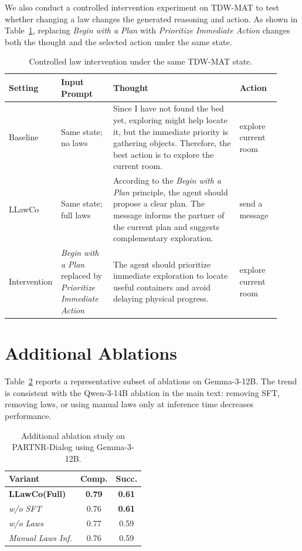\documentclass{article}
\theoremstyle{plain}
\theoremstyle{definition}
\theoremstyle{remark}
\newcommand{\name}{LLawCo\xspace}
\begin{document}
We also conduct a controlled intervention experiment on TDW-MAT to test whether changing a law changes the generated reasoning and action. As shown in Table~\ref{tab:law-intervention}, replacing \textit{Begin with a Plan} with \textit{Prioritize Immediate Action} changes both the thought and the selected action under the same state.

\begin{table}[htbp]
\centering
\small
\setlength{\tabcolsep}{4pt}
\caption{Controlled law intervention under the same TDW-MAT state.}
\label{tab:law-intervention}
\begin{tabular}{p{0.12\linewidth}|p{0.19\linewidth}|p{0.46\linewidth}|p{0.15\linewidth}}
\toprule
\textbf{Setting} & \textbf{Input Prompt} & \textbf{Thought} & \textbf{Action} \\
\midrule
Baseline & Same state; no laws & Since I have not found the bed yet, exploring might help locate it, but the immediate priority is gathering objects. Therefore, the best action is to explore the current room. & explore current room \\
\midrule
\name & Same state; full laws & According to the \textit{Begin with a Plan} principle, the agent should propose a clear plan. The message informs the partner of the current plan and suggests complementary exploration. & send a message \\
\midrule
Intervention & \textit{Begin with a Plan} replaced by \textit{Prioritize Immediate Action} & The agent should prioritize immediate exploration to locate useful containers and avoid delaying physical progress. & explore current room \\
\bottomrule
\end{tabular}
\end{table}

\section{Additional Ablations}
\label{sec:appendix-additional-ablations}

Table~\ref{tab:gemma-ablation} reports a representative subset of ablations on Gemma-3-12B. The trend is consistent with the Qwen-3-14B ablation in the main text: removing SFT, removing laws, or using manual laws only at inference time decreases performance.

\begin{table}[htbp]
\centering
\small
\setlength{\tabcolsep}{6pt}
\caption{Additional ablation study on PARTNR-Dialog using Gemma-3-12B.}
\label{tab:gemma-ablation}
\begin{tabular}{l|cc}
\toprule
\textbf{Variant} & \textbf{Comp.} & \textbf{Succ.} \\
\midrule
\textbf{\name (Full)} & \textbf{0.79} & \textbf{0.61} \\
\textit{w/o SFT} & 0.76 & \textbf{0.61} \\
\textit{w/o Laws} & 0.77 & 0.59 \\
\textit{Manual Laws Inf.} & 0.76 & 0.59 \\
\bottomrule
\end{tabular}
\end{table}
\end{document}
